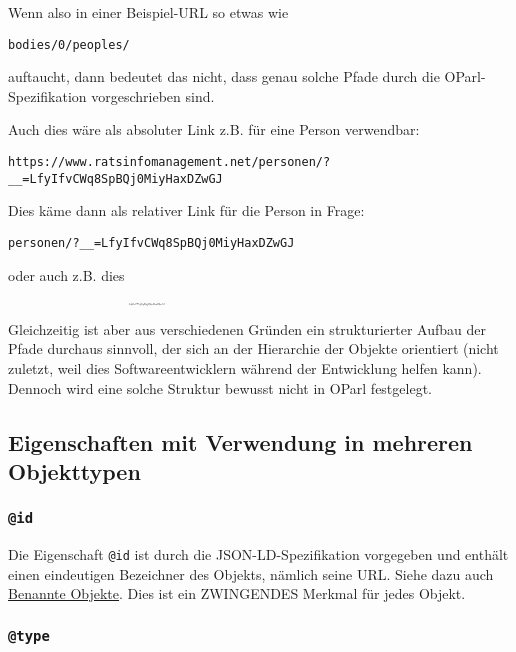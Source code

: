 \documentclass[,a4paper]{article}
\begin{document}
Wenn also in einer Beispiel-URL so etwas wie

\begin{verbatim}
bodies/0/peoples/
\end{verbatim}

auftaucht, dann bedeutet das nicht, dass genau solche Pfade durch die
OParl-Spezifikation vorgeschrieben sind.

Auch dies wäre als absoluter Link z.B. für eine Person verwendbar:

\begin{verbatim}
https://www.ratsinfomanagement.net/personen/?__=LfyIfvCWq8SpBQj0MiyHaxDZwGJ
\end{verbatim}

Dies käme dann als relativer Link für die Person in Frage:

\begin{verbatim}
personen/?__=LfyIfvCWq8SpBQj0MiyHaxDZwGJ
\end{verbatim}

oder auch z.B. dies
\textsubscript{\textsubscript{\textsubscript{\textsubscript{\textsubscript{\textsubscript{\textsubscript{\textsubscript{\textsubscript{\textsubscript{
LfyIfvCWq8SpBQj0MiyHaxDZwGJ }}}}}}}}}}

Gleichzeitig ist aber aus verschiedenen Gründen ein strukturierter
Aufbau der Pfade durchaus sinnvoll, der sich an der Hierarchie der
Objekte orientiert (nicht zuletzt, weil dies Softwareentwicklern während
der Entwicklung helfen kann). Dennoch wird eine solche Struktur bewusst
nicht in OParl festgelegt.

\subsection{Eigenschaften mit Verwendung in mehreren
Objekttypen}\label{eigenschaften-mit-verwendung-in-mehreren-objekttypen}

\subsubsection{\texttt{@id}}\label{id}

Die Eigenschaft \texttt{@id} ist durch die JSON-LD-Spezifikation
vorgegeben und enthält einen eindeutigen Bezeichner des Objekts, nämlich
seine URL. Siehe dazu auch \hyperref[benannteux5fobjekte]{Benannte
Objekte}. Dies ist ein ZWINGENDES Merkmal für jedes Objekt.

\subsubsection{\texttt{@type}}\label{type}
\end{document}
